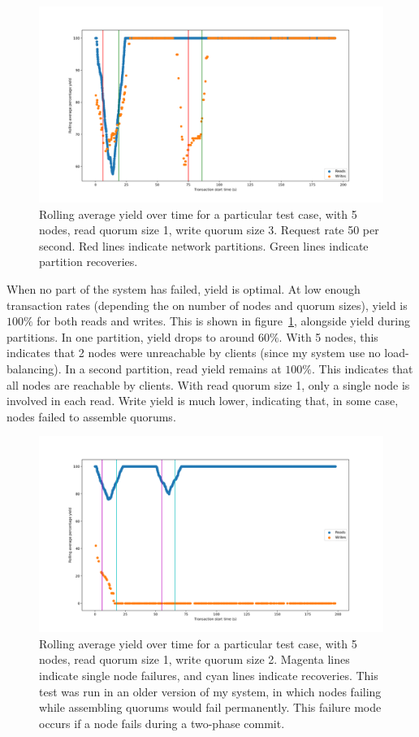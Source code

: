 \documentclass[12pt,a4paper,twoside,openany]{report}
\begin{document}
\begin{figure}[htb]
\centerline{\includegraphics[width=\linewidth]{figs/eval-fig-3.png}}
\caption{Rolling average yield over time for a particular test case, with 5 nodes, read quorum size 1, write quorum size 3. Request rate 50 per second. Red lines indicate network partitions. Green lines indicate partition recoveries.}
\label{single-test-normal}
\end{figure}

When no part of the system has failed, yield is optimal. At low enough transaction rates (depending the on number of nodes and quorum sizes), yield is $100\%$ for both reads and writes. This is shown in figure~\ref{single-test-normal}, alongside yield during partitions. In one partition, yield drops to around $60\%$. With 5 nodes, this indicates that 2 nodes were unreachable by clients (since my system use no load-balancing). In a second partition, read yield remains at $100\%$. This indicates that all nodes are reachable by clients. With read quorum size 1, only a single node is involved in each read. Write yield is much lower, indicating that, in some case, nodes failed to assemble quorums.

\begin{figure}[htb]
\centerline{\includegraphics[width=\linewidth]{figs/culprit.png}}
\caption{Rolling average yield over time for a particular test case, with 5 nodes, read quorum size 1, write quorum size 2. Magenta lines indicate single node failures, and cyan lines indicate recoveries. This test was run in an older version of my system, in which nodes failing while assembling quorums would fail permanently. This failure mode occurs if a node fails during a two-phase commit.}
\label{culprit}
\end{figure}
\end{document}
